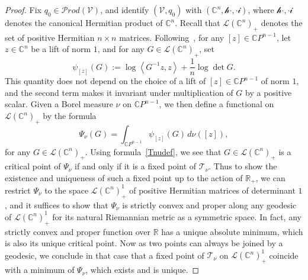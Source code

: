 \documentclass[11pt]{article}
\theoremstyle{definition}
\numberwithin{equation}{section}
\numberwithin{figure}{section}
\numberwithin{table}{section}
\let\cal\mathscr
\newcommand{\R}{{\mathbb{R}}}
\newcommand{\CCC}{{\mathbb{C}}}
\newcommand{\cV}{{\mathcal{V}}}
\newcommand\< {\mathcal{h}}
\renewcommand\> {\mathcal{i}}
\newcommand\TT {{\cal T}}
\newcommand*\cL{\mathscr{L}}
\newcommand{\Prod}{{\mathcal Prod}}
\begin{document}
\goodbreak
\begin{proof}
Fix $q_0\in\Prod(\cV)$, and identify $(\cV,q_0)$ with $(\CCC^n,\<\cdot,\cdot\>)$, where $\<\cdot,\cdot\>$ denotes the canonical Hermitian product of $\CCC^n$. Recall that $\cL(\CCC^n)_+$ denotes the set of positive Hermitian $n\times n$ matrices. Following~\cite[p.~582]{D}, for any $[z]\in\CCC P^{n-1}$, let $z\in\CCC^n$ be a lift of norm $1$, and for any $G\in\cL(\CCC^n)_+$, set
\begin{equation}\label{psizdef}
\psi_{[z]}(G):=\log\left\langle G^{-1}z,z\right\rangle +\frac{1}{n}\log\det G.
\end{equation}
This quantity does not depend on the choice of a lift of $[z]\in\CCC P^{n-1}$ of norm $1$, and the second term makes it invariant under multiplication of $G$ by a positive scalar. Given a Borel measure $\nu$ on $\CCC P^{n-1}$, we then define a functional on $\cL(\CCC^n)_+$ by the formula
\begin{equation}\label{Psinudef}
\Psi_\nu(G)=\int_{\CCC P^{n-1}}\psi_{[z]}(G)\,d\nu([z]),
\end{equation}
for any $G\in\cL(\CCC^n)_+$. Using formula~\eqref{Tnudef}, we see that $G\in\cL(\CCC^n)_+$ is a critical point of $\Psi_\nu$ if and only if it is a fixed point of $\TT_\nu$. Thus to show the existence and uniqueness of such a fixed point up to the action of $\R_+$, we can restrict $\Psi_\nu$ to the space $\cL(\CCC^n)_+^1$ of positive Hermitian matrices of determinant $1$, and it suffices to show that $\Psi_\nu$ is strictly convex and proper along any geodesic of $\cL(\CCC^n)_+^1$ for its natural Riemannian metric as a symmetric space. In fact, any strictly convex and proper function over $\R$ has a unique absolute minimum, which is also its unique critical point. Now as two points can always be joined by a geodesic, we conclude in that case that a fixed point of $\TT_\nu$ on $\cL(\CCC^n)_+^1$ coincide with a minimum of $\Psi_\nu$, which exists and is unique.


\end{proof}
\end{document}
